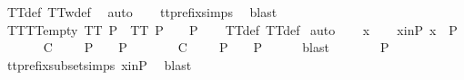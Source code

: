 \ TT{}{\isacharunderscore}def\ TT{}w{\isacharunderscore}def\ \isamarkupfalse%
\ auto\isanewline
\ \ \isamarkupfalse%
\ tt{\isacharunderscore}prefix{\isachardot}simps{\isacharparenleft}{}{\isacharparenright}\ \isamarkupfalse%
\ blast%
\endisatagproof
{\isafoldproof}%
%
\isadelimproof
\isanewline
%
\endisadelimproof
\isanewline
{}\isamarkupfalse%
\ TT{}{\isacharunderscore}TT{}{\isacharunderscore}empty{\isacharcolon}\ {\isachardoublequoteopen}TT{}\ P\ {\isasymLongrightarrow}\ TT{}\ P\ {\isasymLongrightarrow}\ {\isacharbrackleft}{\isacharbrackright}\ {\isasymin}\ P{\isachardoublequoteclose}\isanewline
%
\isadelimproof
\ \ %
\endisadelimproof
%
\isatagproof
{}\isamarkupfalse%
\ TT{}{\isacharunderscore}def\ TT{}{\isacharunderscore}def\isanewline
{}\isamarkupfalse%
\ auto\isanewline
\ \ \isamarkupfalse%
\ x\isanewline
\ \ \isamarkupfalse%
\ x{\isacharunderscore}in{\isacharunderscore}P{\isacharcolon}\ {\isachardoublequoteopen}x\ {\isasymin}\ P{\isachardoublequoteclose}\isanewline
\ \ \isamarkupfalse%
\ {\isachardoublequoteopen}{\isasymforall}{\isasymrho}{\isachardot}\ {\isacharparenleft}{\isasymexists}{\isasymsigma}{\isachardot}\ {\isasymrho}\ {\isasymlesssim}\isactrlsub C\ {\isasymsigma}\ {\isasymand}\ {\isasymsigma}\ {\isasymin}\ P{\isacharparenright}\ {\isasymlongrightarrow}\ {\isasymrho}\ {\isasymin}\ P{\isachardoublequoteclose}\isanewline
\ \ \isamarkupfalse%
\ \isamarkupfalse%
\ {\isachardoublequoteopen}{\isacharparenleft}{\isasymexists}{\isasymsigma}{\isachardot}\ {\isacharbrackleft}{\isacharbrackright}\ {\isasymlesssim}\isactrlsub C\ {\isasymsigma}\ {\isasymand}\ {\isasymsigma}\ {\isasymin}\ P{\isacharparenright}\ {\isasymlongrightarrow}\ {\isacharbrackleft}{\isacharbrackright}\ {\isasymin}\ P{\isachardoublequoteclose}\isanewline
\ \ \ \ \isamarkupfalse%
\ blast\isanewline
\ \ \isamarkupfalse%
\ \isamarkupfalse%
\ {\isachardoublequoteopen}{\isacharbrackleft}{\isacharbrackright}\ {\isasymin}\ P{\isachardoublequoteclose}\isanewline
\ \ \ \ \isamarkupfalse%
\ tt{\isacharunderscore}prefix{\isacharunderscore}subset{\isachardot}simps{\isacharparenleft}{}{\isacharparenright}\ x{\isacharunderscore}in{\isacharunderscore}P\ \isamarkupfalse%
\ blast\isanewline
\ \ \isamarkupfalse%
